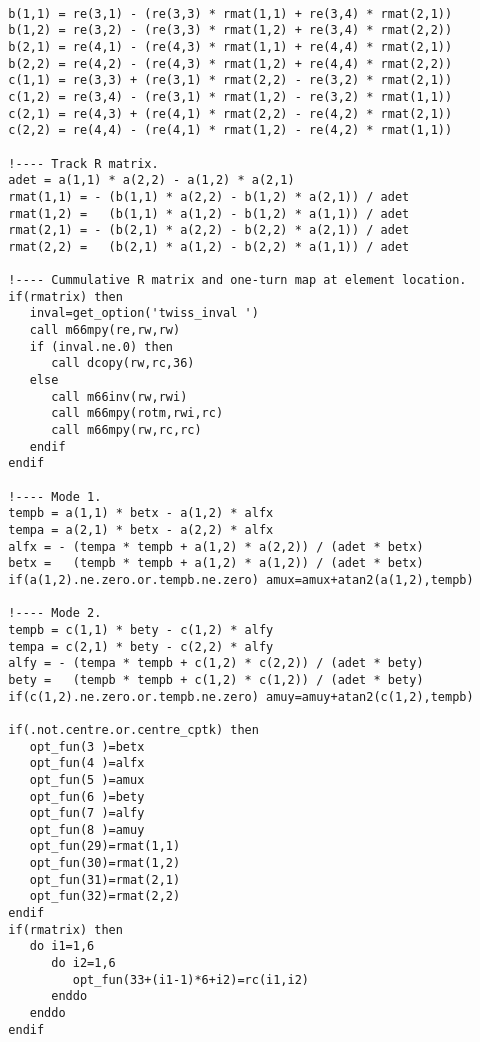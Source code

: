 \documentclass{cern-art} %
\begin{document}
\begin{lstlisting}[firstnumber=last]

  b(1,1) = re(3,1) - (re(3,3) * rmat(1,1) + re(3,4) * rmat(2,1))
  b(1,2) = re(3,2) - (re(3,3) * rmat(1,2) + re(3,4) * rmat(2,2))
  b(2,1) = re(4,1) - (re(4,3) * rmat(1,1) + re(4,4) * rmat(2,1))
  b(2,2) = re(4,2) - (re(4,3) * rmat(1,2) + re(4,4) * rmat(2,2))
  c(1,1) = re(3,3) + (re(3,1) * rmat(2,2) - re(3,2) * rmat(2,1))
  c(1,2) = re(3,4) - (re(3,1) * rmat(1,2) - re(3,2) * rmat(1,1))
  c(2,1) = re(4,3) + (re(4,1) * rmat(2,2) - re(4,2) * rmat(2,1))
  c(2,2) = re(4,4) - (re(4,1) * rmat(1,2) - re(4,2) * rmat(1,1))

  !---- Track R matrix.
  adet = a(1,1) * a(2,2) - a(1,2) * a(2,1)
  rmat(1,1) = - (b(1,1) * a(2,2) - b(1,2) * a(2,1)) / adet
  rmat(1,2) =   (b(1,1) * a(1,2) - b(1,2) * a(1,1)) / adet
  rmat(2,1) = - (b(2,1) * a(2,2) - b(2,2) * a(2,1)) / adet
  rmat(2,2) =   (b(2,1) * a(1,2) - b(2,2) * a(1,1)) / adet

  !---- Cummulative R matrix and one-turn map at element location.
  if(rmatrix) then
     inval=get_option('twiss_inval ')
     call m66mpy(re,rw,rw)
     if (inval.ne.0) then
        call dcopy(rw,rc,36)
     else
        call m66inv(rw,rwi)
        call m66mpy(rotm,rwi,rc)
        call m66mpy(rw,rc,rc)
     endif
  endif

  !---- Mode 1.
  tempb = a(1,1) * betx - a(1,2) * alfx
  tempa = a(2,1) * betx - a(2,2) * alfx
  alfx = - (tempa * tempb + a(1,2) * a(2,2)) / (adet * betx)
  betx =   (tempb * tempb + a(1,2) * a(1,2)) / (adet * betx)
  if(a(1,2).ne.zero.or.tempb.ne.zero) amux=amux+atan2(a(1,2),tempb)

  !---- Mode 2.
  tempb = c(1,1) * bety - c(1,2) * alfy
  tempa = c(2,1) * bety - c(2,2) * alfy
  alfy = - (tempa * tempb + c(1,2) * c(2,2)) / (adet * bety)
  bety =   (tempb * tempb + c(1,2) * c(1,2)) / (adet * bety)
  if(c(1,2).ne.zero.or.tempb.ne.zero) amuy=amuy+atan2(c(1,2),tempb)

  if(.not.centre.or.centre_cptk) then
     opt_fun(3 )=betx
     opt_fun(4 )=alfx
     opt_fun(5 )=amux
     opt_fun(6 )=bety
     opt_fun(7 )=alfy
     opt_fun(8 )=amuy
     opt_fun(29)=rmat(1,1)
     opt_fun(30)=rmat(1,2)
     opt_fun(31)=rmat(2,1)
     opt_fun(32)=rmat(2,2)
  endif
  if(rmatrix) then
     do i1=1,6
        do i2=1,6
           opt_fun(33+(i1-1)*6+i2)=rc(i1,i2)
        enddo
     enddo
  endif
\end{lstlisting}
\end{document}

